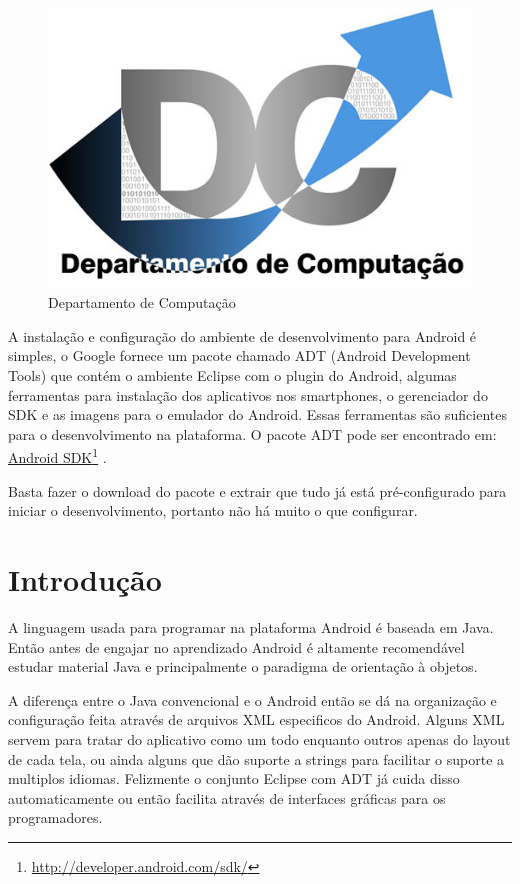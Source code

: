 \documentclass[a4paper,12pt,brazil,doubleside]{book}
\begin{document}
\pagestyle{body}


\begin{figure}[!htb]
  \centering
  \includegraphics[width=.5\textwidth]{../figuras/LogoDC.jpg}
  \caption{Departamento de Computação}
  \label{fig:dc}
\end{figure}



A instalação e configuração do ambiente de desenvolvimento para Android é simples, o Google fornece um pacote chamado ADT (Android Development Tools) que contém o ambiente Eclipse com o plugin do Android, algumas ferramentas para instalação dos aplicativos nos smartphones, o gerenciador do SDK e as imagens para o emulador do Android. Essas ferramentas são suficientes para o desenvolvimento na plataforma.
O pacote ADT pode ser encontrado em: \href{http://developer.android.com/sdk/}{Android SDK}\footnote{\href{http://developer.android.com/sdk/}{http://developer.android.com/sdk/}} .

Basta fazer o download do pacote e extrair que tudo já está pré-configurado para iniciar o desenvolvimento, portanto não há muito o que configurar.

\section{Introdução}
A linguagem usada para programar na plataforma Android é baseada em Java. Então antes de engajar no aprendizado Android é altamente recomendável estudar material Java e principalmente o paradigma de orientação à objetos.

A diferença entre o Java convencional e o Android então se dá na organização e configuração feita através de arquivos XML especificos do Android. Alguns XML servem para tratar do aplicativo como um todo enquanto outros apenas do layout de cada tela, ou ainda alguns que dão suporte a strings para facilitar o suporte a multiplos idiomas.
Felizmente o conjunto Eclipse com ADT já cuida disso automaticamente ou então facilita através de interfaces gráficas para os programadores.
\end{document}
